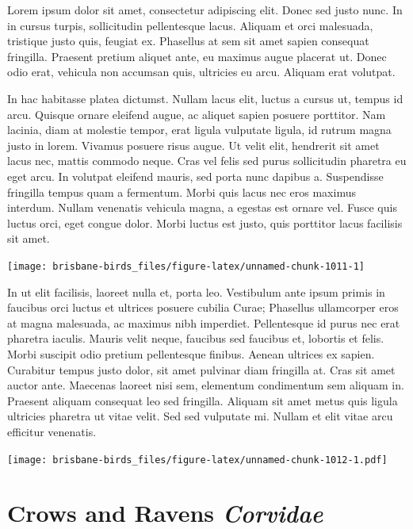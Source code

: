 \documentclass[]{book}
\let\origfigure\figure
\let\endorigfigure\endfigure
\renewenvironment{figure}[1][2] {
  \expandafter\origfigure\expandafter[H]
} {
  \endorigfigure
}
\begin{document}
Lorem ipsum dolor sit amet, consectetur adipiscing elit. Donec sed justo
nunc. In in cursus turpis, sollicitudin pellentesque lacus. Aliquam et
orci malesuada, tristique justo quis, feugiat ex. Phasellus at sem sit
amet sapien consequat fringilla. Praesent pretium aliquet ante, eu
maximus augue placerat ut. Donec odio erat, vehicula non accumsan quis,
ultricies eu arcu. Aliquam erat volutpat.

In hac habitasse platea dictumst. Nullam lacus elit, luctus a cursus ut,
tempus id arcu. Quisque ornare eleifend augue, ac aliquet sapien posuere
porttitor. Nam lacinia, diam at molestie tempor, erat ligula vulputate
ligula, id rutrum magna justo in lorem. Vivamus posuere risus augue. Ut
velit elit, hendrerit sit amet lacus nec, mattis commodo neque. Cras vel
felis sed purus sollicitudin pharetra eu eget arcu. In volutpat eleifend
mauris, sed porta nunc dapibus a. Suspendisse fringilla tempus quam a
fermentum. Morbi quis lacus nec eros maximus interdum. Nullam venenatis
vehicula magna, a egestas est ornare vel. Fusce quis luctus orci, eget
congue dolor. Morbi luctus est justo, quis porttitor lacus facilisis sit
amet.

\begin{figure}
\texttt{[image: brisbane-birds\_files/figure-latex/unnamed-chunk-1011-1]} \caption{insert figure caption}\label{fig:unnamed-chunk-1011}
\end{figure}

In ut elit facilisis, laoreet nulla et, porta leo. Vestibulum ante ipsum
primis in faucibus orci luctus et ultrices posuere cubilia Curae;
Phasellus ullamcorper eros at magna malesuada, ac maximus nibh
imperdiet. Pellentesque id purus nec erat pharetra iaculis. Mauris velit
neque, faucibus sed faucibus et, lobortis et felis. Morbi suscipit odio
pretium pellentesque finibus. Aenean ultrices ex sapien. Curabitur
tempus justo dolor, sit amet pulvinar diam fringilla at. Cras sit amet
auctor ante. Maecenas laoreet nisi sem, elementum condimentum sem
aliquam in. Praesent aliquam consequat leo sed fringilla. Aliquam sit
amet metus quis ligula ultricies pharetra ut vitae velit. Sed sed
vulputate mi. Nullam et elit vitae arcu efficitur venenatis.

\begin{figure}
\centering
\texttt{[image: brisbane-birds\_files/figure-latex/unnamed-chunk-1012-1.pdf]}
\caption{\label{fig:unnamed-chunk-1012}insert figure caption}
\end{figure}

\chapter{\texorpdfstring{Crows and Ravens
\emph{Corvidae}}{Crows and Ravens Corvidae}}\label{crows-and-ravens-corvidae}
\end{document}
